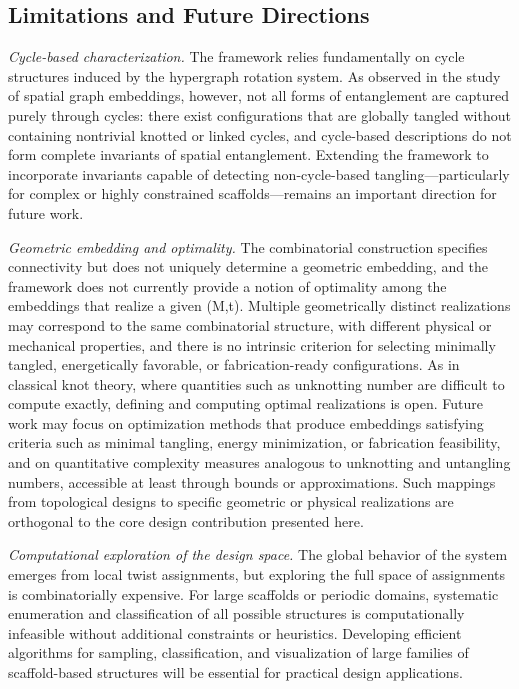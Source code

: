 \documentclass[acmtog,anonymous,review]{acmart}
\begin{document}
\subsection{Limitations and Future Directions}

\textit{Cycle-based characterization.}
The framework relies fundamentally on cycle structures induced by the hypergraph rotation system. As observed in the study of spatial graph embeddings, however, not all forms of entanglement are captured purely through cycles: there exist configurations that are globally tangled without containing nontrivial knotted or linked cycles, and cycle-based descriptions do not form complete invariants of spatial entanglement. Extending the framework to incorporate invariants capable of detecting non-cycle-based tangling---particularly for complex or highly constrained scaffolds---remains an important direction for future work.

\textit{Geometric embedding and optimality.} 
The combinatorial construction specifies connectivity but does not uniquely determine a geometric embedding, and the framework does not currently provide a notion of optimality among the embeddings that realize a given (M,t). Multiple geometrically distinct realizations may correspond to the same combinatorial structure, with different physical or mechanical properties, and there is no intrinsic criterion for selecting minimally tangled, energetically favorable, or fabrication-ready configurations. As in classical knot theory, where quantities such as unknotting number are difficult to compute exactly, defining and computing optimal realizations is open. Future work may focus on optimization methods that produce embeddings satisfying criteria such as minimal tangling, energy minimization, or fabrication feasibility, and on quantitative complexity measures analogous to unknotting and untangling numbers, accessible at least through bounds or approximations. Such mappings from topological designs to specific geometric or physical realizations are orthogonal to the core design contribution presented here.

\textit{Computational exploration of the design space.}
The global behavior of the system emerges from local twist assignments, but exploring the full space of assignments is combinatorially expensive. For large scaffolds or periodic domains, systematic enumeration and classification of all possible structures is computationally infeasible without additional constraints or heuristics. Developing efficient algorithms for sampling, classification, and visualization of large families of scaffold-based structures will be essential for practical design applications.
\end{document}
